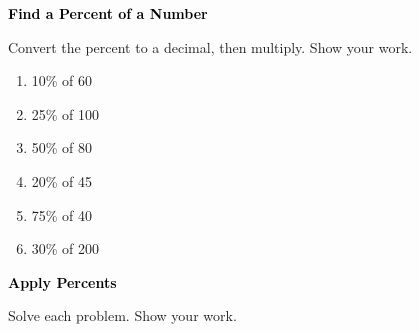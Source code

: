 \documentclass[12pt, letterpaper, fleqn]{article}
\begin{document}
\newpage

\begin{tcolorbox}[colback=customteal!20]
\large\textcolor{black}{\textbf{Find a Percent of a Number}}
\end{tcolorbox}

\noindent
Convert the percent to a decimal, then multiply. Show your work.

\vspace{3mm}

\begin{enumerate}[itemsep=0.8cm, leftmargin=0.6cm]

\item 10\% of 60\\
\vspace{1.2cm}

\item 25\% of 100\\
\vspace{1.2cm}

\item 50\% of 80\\
\vspace{1.2cm}

\item 20\% of 45\\
\vspace{1.2cm}

\item 75\% of 40\\
\vspace{1.2cm}

\item 30\% of 200\\
\vspace{1.3cm}

\end{enumerate}

\newpage

\begin{tcolorbox}[colback=customteal!20]
\large\textcolor{black}{\textbf{Apply Percents}}
\end{tcolorbox}

\noindent
Solve each problem. Show your work.

\vspace{3mm}
\end{document}
